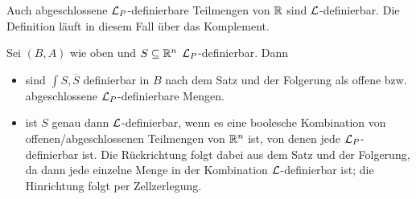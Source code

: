 \begin{corollary}
	Auch abgeschlossene $\mathcal{L}_P$-definierbare Teilmengen von $\mathbb{R}$ sind $\mathcal{L}$-definierbar. Die Definition läuft in diesem Fall über das Komplement.
\end{corollary}
\begin{corollary}
	Sei $(B,A)$ wie oben und $S\subseteq\mathbb{R}^n$ $\mathcal{L}_P$-definierbar. Dann
	\begin{itemize}
		\item sind $\int S,\overline{S}$ definierbar in $B$ nach dem Satz und der Folgerung als offene bzw. abgeschlossene $\mathcal{L}_P$-definierbare Mengen.
		\item ist $S$ genau dann $\mathcal{L}$-definierbar, wenn es eine boolesche Kombination von offenen/abgeschlossenen Teilmengen von $\mathbb{R}^n$ ist, von denen jede $\mathcal{L}_P$-definierbar ist. Die Rückrichtung folgt dabei aus dem Satz und der Folgerung, da dann jede einzelne Menge in der Kombination $\mathcal{L}$-definierbar ist; die Hinrichtung folgt per Zellzerlegung.
	\end{itemize}
\end{corollary}